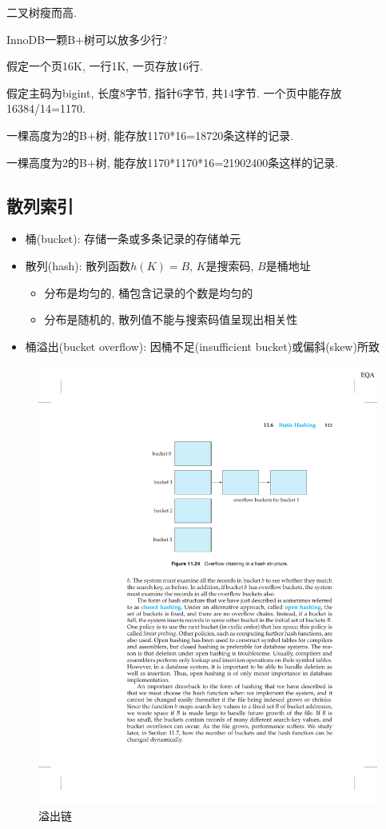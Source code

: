 二叉树瘦而高.


InnoDB一颗B+树可以放多少行?
\begin{example}
    假定一个页16K, 一行1K, 一页存放16行.

    假定主码为bigint, 长度8字节, 指针6字节, 共14字节. 一个页中能存放16384/14=1170.

    一棵高度为2的B+树, 能存放1170*16=18720条这样的记录.

    一棵高度为2的B+树, 能存放1170*1170*16=21902400条这样的记录.
\end{example}

\subsection{散列索引}

\begin{itemize}
    \item 桶(bucket): 存储一条或多条记录的存储单元
    \item 散列(hash): 散列函数$h(K)=B$, $K$是搜索码, $B$是桶地址
    \begin{itemize}
        \item 分布是均匀的, 桶包含记录的个数是均匀的
        \item 分布是随机的, 散列值不能与搜索码值呈现出相关性
    \end{itemize}
    \item 桶溢出(bucket overflow): 因桶不足(insufficient bucket)或偏斜(skew)所致
\end{itemize}



\begin{figure}[H]
    \centering
    \includegraphics[width=.47\textwidth]{figure/溢出链.pdf}
    \caption{溢出链}
\end{figure}

